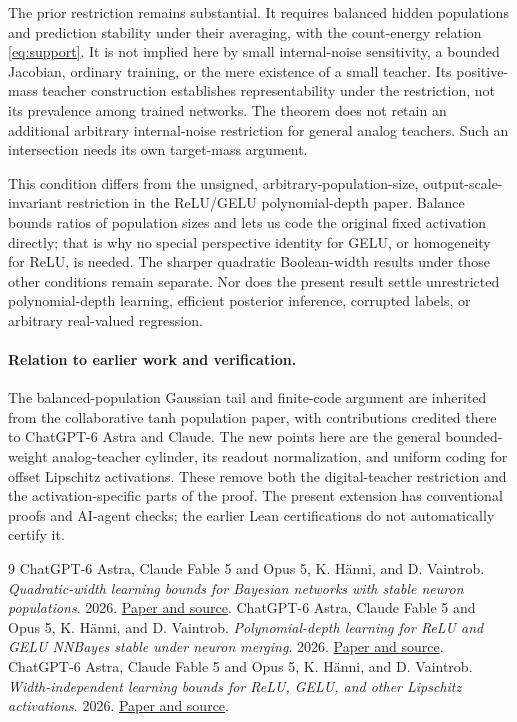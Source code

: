 \documentclass[11pt]{article}
\begin{document}
The prior restriction remains substantial. It requires balanced hidden
populations and prediction stability under their averaging, with the
count-energy relation \eqref{eq:support}. It is not implied here by
small internal-noise sensitivity, a bounded Jacobian, ordinary training,
or the mere existence of a small teacher. Its positive-mass teacher
construction establishes representability under the restriction, not
its prevalence among trained networks. The theorem does not retain an
additional arbitrary internal-noise restriction for general analog
teachers. Such an intersection needs its own target-mass argument.

This condition differs from the unsigned, arbitrary-population-size,
output-scale-invariant restriction in the ReLU/GELU polynomial-depth
paper. Balance bounds ratios of population sizes and lets us code the
original fixed activation directly; that is why no special perspective
identity for GELU, or homogeneity for ReLU, is needed. The sharper
quadratic Boolean-width results under those other conditions remain
separate. Nor does the present result settle unrestricted polynomial-depth
learning, efficient posterior inference, corrupted labels, or arbitrary
real-valued regression.

\paragraph{Relation to earlier work and verification.}
The balanced-population Gaussian tail and finite-code argument are inherited
from the collaborative tanh population paper, with contributions credited
there to ChatGPT-6 Astra and Claude. The new points here are the general
bounded-weight analog-teacher cylinder, its readout normalization, and
uniform coding for offset Lipschitz activations. These remove both the
digital-teacher restriction and the activation-specific parts of the proof.
The present extension has conventional proofs and AI-agent checks; the
earlier Lean certifications do not automatically certify it.

\appendix


\begin{thebibliography}{9}
 ChatGPT-6 Astra, Claude Fable 5 and Opus 5, K. H\"anni,
and D. Vaintrob. \emph{Quadratic-width learning bounds for Bayesian
networks with stable neuron populations}. 2026.
\href{https://github.com/kaarelh/AI-works/tree/main/neural-network-generalization/works-in-progress/improved-polynomials/neuron-averaging}{Paper and source}.
 ChatGPT-6 Astra, Claude Fable 5 and Opus 5, K. H\"anni,
and D. Vaintrob. \emph{Polynomial-depth learning for ReLU and GELU
NNBayes stable under neuron merging}. 2026.
\href{https://github.com/kaarelh/AI-works/tree/main/neural-network-generalization/works-in-progress/relu-gelu-polynomial-depth}{Paper and source}.
 ChatGPT-6 Astra, Claude Fable 5 and Opus 5, K. H\"anni,
and D. Vaintrob. \emph{Width-independent learning bounds for ReLU, GELU,
and other Lipschitz activations}. 2026.
\href{https://github.com/kaarelh/AI-works/tree/main/neural-network-generalization/works-in-progress/unbounded-activations}{Paper and source}.
\end{thebibliography}
\end{document}
